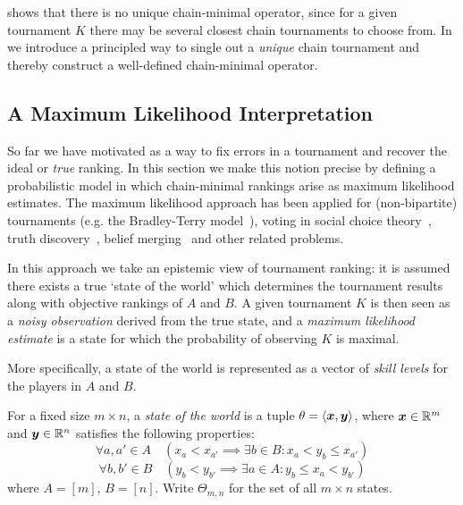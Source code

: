  shows that there is no unique chain-minimal operator, since for
a given tournament $K$ there may be several closest chain tournaments to choose
from. In  we introduce a principled way to
single out a \emph{unique} chain tournament and thereby construct a
well-defined chain-minimal operator.

\subsection{A Maximum Likelihood Interpretation}
\label{tourn_sec_mle}

So far we have motivated  as a way to fix
errors in a tournament and recover the ideal or \emph{true} ranking. In this
section we make this notion precise by defining a probabilistic model in which
chain-minimal rankings arise as maximum likelihood estimates.
%
The maximum likelihood approach has been applied for (non-bipartite)
tournaments (e.g. the Bradley-Terry
model~\cite{bradley_terry_52,gonzalez2014paired}), voting in social choice
theory~\cite{elkind2016rationalizations}, truth
discovery~\cite{wang_truth_2012}, belief merging~\cite{everaere2020} and other
related problems.

In this approach we take an epistemic view of tournament ranking: it is assumed
there exists a true `state of the world' which determines the tournament
results along with objective rankings of $A$ and $B$. A given
tournament $K$ is then seen as a \emph{noisy observation} derived from the
true state, and a \emph{maximum likelihood estimate} is a state for which the
probability of observing $K$ is maximal.

More specifically, a state of the world is represented as a vector of
\emph{skill levels} for the players in $A$ and $B$.\footnotemark{}


\begin{definition}
   \label{tourn_def_stateworld}

    For a fixed size $m \times n$, a \emph{state of the world} is a tuple
    $\theta = \langle{\bm{x}, \bm{y}}\rangle$, where $\bm{x} \in \mathbb{R}^m$ and
    $\bm{y} \in \mathbb{R}^n$ satisfies the following properties:
   \begin{equation}
        \forall a, a' \in A \quad (
            x_a < x_{a'} \implies \exists b \in B: x_a < y_b \le x_{a'}
        )
        \label{tourn_eqn_state_condition_a}
   \end{equation}
   \begin{equation}
        \forall b, b' \in B \quad(
            y_b < y_{b'} \implies \exists a \in A: y_b \le x_a < y_{b'}
        )
        \label{tourn_eqn_state_condition_b}
   \end{equation}
   where $A = [m]$, $B = [n]$. Write $\Theta_{m,n}$ for the set of all $m
   \times n$ states.

\end{definition}


